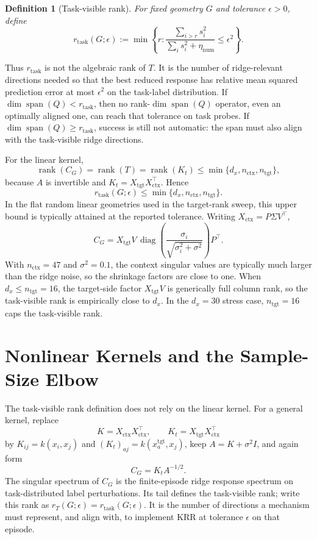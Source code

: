 \documentclass[11pt]{article}
\newtheorem{definition}{Definition}
\newcommand{\spanop}{\operatorname{span}}
\begin{document}
\begin{definition}[Task-visible rank]
For fixed geometry \(G\) and tolerance \(\epsilon>0\), define
\[
r_{\mathrm{task}}(G;\epsilon)
:=
\min\left\{
r:
\frac{\sum_{i>r}s_i^2}{\sum_i s_i^2+\eta_{\mathrm{num}}}
\le \epsilon^2
\right\}.
\]
\end{definition}

Thus \(r_{\mathrm{task}}\) is not the algebraic rank of \(T\). It is the number of ridge-relevant
directions needed so that the best reduced response has relative mean squared prediction error at
most \(\epsilon^2\) on the task-label distribution. If \(\dim\spanop(Q)<r_{\mathrm{task}}\), then no
rank-\(\dim\spanop(Q)\) operator, even an optimally aligned one, can reach that tolerance on task
probes. If \(\dim\spanop(Q)\ge r_{\mathrm{task}}\), success is still not automatic: the span must also
align with the task-visible ridge directions.

For the linear kernel,
\[
\operatorname{rank}(C_G)
=\operatorname{rank}(T)
=\operatorname{rank}(K_t)
\le \min\{d_x,n_{\mathrm{ctx}},n_{\mathrm{tgt}}\},
\]
because \(A\) is invertible and \(K_t=X_{\mathrm{tgt}}X_{\mathrm{ctx}}^\top\). Hence
\[
r_{\mathrm{task}}(G;\epsilon)
\le \min\{d_x,n_{\mathrm{ctx}},n_{\mathrm{tgt}}\}.
\]
In the flat random linear geometries used in the target-rank sweep, this upper bound is typically
attained at the reported tolerance. Writing \(X_{\mathrm{ctx}}=P\Sigma V^\top\),
\[
C_G
=X_{\mathrm{tgt}}V\,
\operatorname{diag}\!\left(\frac{\sigma_i}{\sqrt{\sigma_i^2+\sigma^2}}\right)P^\top .
\]
With \(n_{\mathrm{ctx}}=47\) and \(\sigma^2=0.1\), the context singular values are typically much
larger than the ridge noise, so the shrinkage factors are close to one. When
\(d_x\le n_{\mathrm{tgt}}=16\), the target-side factor \(X_{\mathrm{tgt}}V\) is generically full column
rank, so the task-visible rank is empirically close to \(d_x\). In the \(d_x=30\) stress case,
\(n_{\mathrm{tgt}}=16\) caps the task-visible rank.

\section{Nonlinear Kernels and the Sample-Size Elbow}

The task-visible rank definition does not rely on the linear kernel. For a general kernel, replace
\[
K=X_{\mathrm{ctx}}X_{\mathrm{ctx}}^\top,
\qquad
K_t=X_{\mathrm{tgt}}X_{\mathrm{ctx}}^\top
\]
by \(K_{ij}=k(x_i,x_j)\) and \((K_t)_{aj}=k(x_a^{\mathrm{tgt}},x_j)\), keep
\(A=K+\sigma^2 I\), and again form
\[
C_G=K_tA^{-1/2}.
\]
The singular spectrum of \(C_G\) is the finite-episode ridge response spectrum on task-distributed
label perturbations. Its tail defines the task-visible rank; write this rank as
\(r_T(G;\epsilon)=r_{\mathrm{task}}(G;\epsilon)\). It is the number of directions a mechanism must
represent, and align with, to implement KRR at tolerance \(\epsilon\) on that episode.
\end{document}
